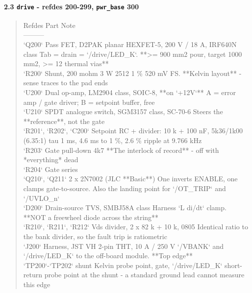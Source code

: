 \documentclass[11pt,a4paper]{article}
\begin{document}
\paragraph*{2.3 \texttt{drive} - refdes 200-299, \texttt{pwr\_base} 300}
\begin{quote}\small\ttfamily\raggedright
\textbar{} Refdes \textbar{} Part \textbar{} Note \textbar{}\\
\textbar{}---\textbar{}---\textbar{}---\textbar{}\\
\textbar{} `Q200` \textbar{} Pass FET, D2PAK planar HEXFET-5, 200 V / 18 A, IRF640N class \textbar{} Tab = drain = `/drive/LED\_K`. {*}{*}\textgreater{}= 900 mm2 pour, target 1000 mm2, \textgreater{}= 12 thermal vias{*}{*} \textbar{}\\
\textbar{} `R200` \textbar{} Shunt, 200 mohm 3 W 2512 1 \% \textbar{} 520 mV FS. {*}{*}Kelvin layout{*}{*} - sense traces to the pad ends \textbar{}\\
\textbar{} `U200` \textbar{} Dual op-amp, LM2904 class, SOIC-8, {*}{*}on `+12V`{*}{*} \textbar{} A = error amp / gate driver; B = setpoint buffer, free \textbar{}\\
\textbar{} `U210` \textbar{} SPDT analogue switch, SGM3157 class, SC-70-6 \textbar{} Steers the {*}{*}reference{*}{*}, not the gate \textbar{}\\
\textbar{} `R201`, `R202`, `C200` \textbar{} Setpoint RC + divider: 10 k + 100 nF, 5k36/1k00 (6.35:1) \textbar{} tau 1 ms, 4.6 ms to 1 \%, 2.6 \% ripple at 9.766 kHz \textbar{}\\
\textbar{} `R203` \textbar{} Gate pull-down 4k7 \textbar{} {*}{*}The interlock of record{*}{*} - off with {*}everything{*} dead \textbar{}\\
\textbar{} `R204` \textbar{} Gate series \textbar{} \textbar{}\\
\textbar{} `Q210`, `Q211` \textbar{} 2 x 2N7002 (JLC {*}{*}Basic{*}{*}) \textbar{} One inverts ENABLE, one clamps gate-to-source. Also the landing point for `/OT\_TRIP` and `/UVLO\_n` \textbar{}\\
\textbar{} `D200` \textbar{} Drain-source TVS, SMBJ58A class \textbar{} Harness `L di/dt` clamp. {*}{*}NOT a freewheel diode across the string{*}{*} \textbar{}\\
\textbar{} `R210`, `R211`, `R212` \textbar{} Vds divider, 2 x 82 k + 10 k, 0805 \textbar{} Identical ratio to the bank divider, so the fault trip is ratiometric \textbar{}\\
\textbar{} `J200` \textbar{} Harness, JST VH 2-pin THT, 10 A / 250 V \textbar{} `/VBANK` and `/drive/LED\_K` to the off-board module. {*}{*}Top edge{*}{*} \textbar{}\\
\textbar{} `TP200`-`TP202` \textbar{} shunt Kelvin probe point, gate, `/drive/LED\_K` \textbar{} short-return probe point at the shunt - a standard ground lead cannot measure this edge \textbar{}
\end{quote}
\end{document}
